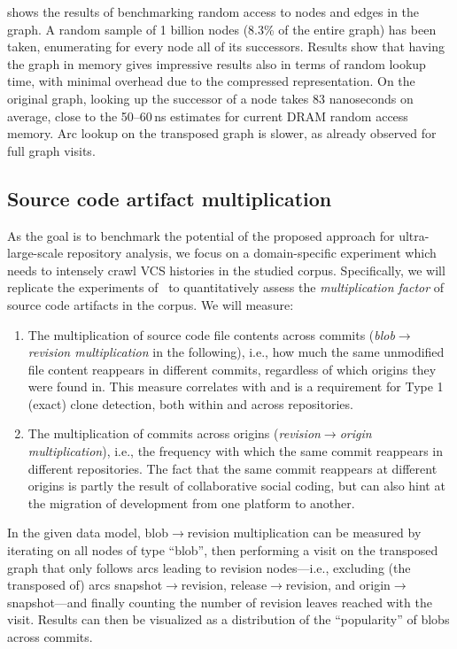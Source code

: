  shows the results of benchmarking
random access to nodes and edges in the graph. A random sample of 1 billion
nodes (8.3\% of the entire graph) has been taken, enumerating for every node
all of its successors.  Results show that having the graph in memory gives
impressive results also in terms of random lookup time, with minimal overhead
due to the compressed representation. On the original graph, looking up the
successor of a node takes 83 nanoseconds on average, close to the 50--60\,ns
estimates for current DRAM random access memory. Arc lookup on the transposed
graph is slower, as already observed for full graph visits.


\subsection{Source code artifact multiplication}%
\label{sec:compression-expmultiplication}

As the goal is to benchmark the potential of the proposed approach for
ultra-large-scale repository analysis, we focus on a domain-specific experiment
which needs to intensely crawl VCS histories in the studied corpus.
Specifically, we will replicate the experiments of~\cite{swh-provenance-tr} to
quantitatively assess the \emph{multiplication factor} of source code artifacts
in the corpus. We will measure:
\begin{enumerate}

\item The multiplication of source code file contents across commits
  (\emph{blob$\to$revision multiplication} in the following), i.e., how much
  the same unmodified file content reappears in different commits, regardless
  of which origins they were found in. This measure correlates with and
  is a requirement for Type 1 (exact) clone detection, both within and across
  repositories.

\item The multiplication of commits across origins (\emph{revision$\to$origin
  multiplication}), i.e., the frequency with which the same commit reappears
  in different repositories. The fact that the same commit reappears at
  different origins is partly the result of collaborative social coding,
  but can also hint at the migration of development from one platform to
  another.

\end{enumerate}

In the given data model, blob$\to$revision multiplication can be measured by
iterating on all nodes of type ``blob'', then performing a visit on the
transposed graph that only follows arcs leading to revision nodes---i.e.,
excluding (the transposed of) arcs snapshot$\to$revision, release$\to$revision,
and origin$\to$ snapshot---and finally counting the number of revision leaves
reached with the visit. Results can then be visualized as a distribution of the
``popularity'' of blobs across commits.

